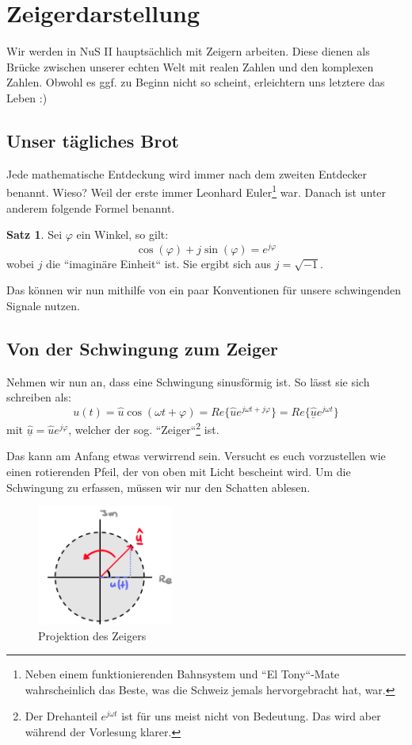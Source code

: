 \documentclass[11pt,a4paper]{article}
\begin{document}
\section{Zeigerdarstellung}
Wir werden in NuS II hauptsächlich mit Zeigern arbeiten. Diese dienen als Brücke zwischen unserer echten Welt mit realen Zahlen und den komplexen Zahlen. Obwohl es ggf. zu Beginn nicht so scheint, erleichtern uns letztere das Leben :)

\subsection{Unser tägliches Brot}
Jede mathematische Entdeckung wird immer nach dem zweiten Entdecker benannt. Wieso? Weil der erste immer Leonhard Euler\footnote{Neben einem funktionierenden Bahnsystem und ``El Tony``-Mate wahrscheinlich das Beste, was die Schweiz jemals hervorgebracht hat, war.} war. Danach ist unter anderem folgende Formel benannt.

\theoremstyle{definition}
\newtheorem*{definition}{Satz}
\begin{definition}
Sei \( \varphi \) ein Winkel, so gilt:
\[
\cos(\varphi) + j \sin(\varphi) = e^{j\varphi}
\]
wobei \( j \) die ``imaginäre Einheit`` ist. Sie ergibt sich aus \( j = \sqrt{-1} \).
\end{definition}

\noindent Das können wir nun mithilfe von ein paar Konventionen für unsere schwingenden Signale nutzen.

\subsection{Von der Schwingung zum Zeiger}

Nehmen wir nun an, dass eine Schwingung sinusförmig ist. So lässt sie sich schreiben als:
\[
u(t) = \hat{u}\cos(\omega t + \varphi) = Re\{\hat{u}e^{j\omega t + j\varphi}\} = Re\{\hat{\underline{u}} e^{j\omega t}\}
\]
mit \( \hat{\underline{u}} = \hat{u} e^{j\varphi} \), welcher der sog. ``Zeiger``\footnote{Der Drehanteil \( e^{j\omega t} \) ist für uns meist nicht von Bedeutung. Das wird aber während der Vorlesung klarer.} ist.
\vspace{0.3cm}

Das kann am Anfang etwas verwirrend sein. Versucht es euch vorzustellen wie einen rotierenden Pfeil, der von oben mit Licht bescheint wird. Um die Schwingung zu erfassen, müssen wir nur den Schatten ablesen.

\centering 
\begin{figure}[H]
  \centering
  \includegraphics[width=0.4\textwidth]{pointer.png}
  \caption{Projektion des Zeigers}
  \label{fig:pointer}
\end{figure}
\centering
\end{document}
